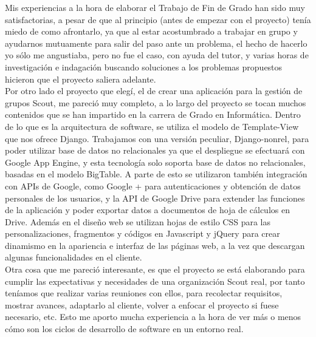 



Mis experiencias a la hora de elaborar el Trabajo de Fin de Grado han sido muy satisfactorias, a pesar de que al principio 
(antes de empezar con el proyecto) tenía miedo de como afrontarlo, ya que al estar acostumbrado a trabajar en grupo y ayudarnos 
mutuamente para salir del paso ante un problema, el hecho de hacerlo yo sólo me angustiaba, pero no fue el caso, con ayuda del 
tutor, y varias horas de investigación e indagación buscando soluciones a los problemas propuestos hicieron que el proyecto saliera adelante.\\

Por otro lado el proyecto que elegí, el de crear una aplicación para la gestión de grupos Scout, me pareció muy completo, a lo 
largo del proyecto se tocan muchos contenidos que se han impartido en la carrera de Grado en Informática. Dentro de lo que es la 
arquitectura de software, se utiliza el modelo de Template-View que nos ofrece Django. Trabajamos con una versión peculiar,
Django-nonrel, para poder utilizar base de datos no relacionales ya que el despliegue se efectuará con Google App Engine, y esta tecnología 
solo soporta base de datos no relacionales, basadas en el modelo BigTable. A parte de esto se utilizaron también integración 
con APIs de Google, como Google + para autenticaciones y obtención de datos personales de los usuarios, y la API de Google Drive para extender 
las funciones de la aplicación y poder exportar datos a documentos de hoja de cálculos en Drive. Además en el diseño web se utilizan 
hojas de estilo CSS para las personalizaciones, fragmentos y códigos en Javascript y jQuery para crear dinamismo en la apariencia e interfaz de las páginas web, 
a la vez que descargan algunas funcionalidades en el cliente.\\

Otra cosa que me pareció interesante, es que el proyecto se está elaborando para cumplir las expectativas y necesidades de una organización 
Scout real, por tanto teníamos que realizar varias reuniones con ellos, para recolectar requisitos, mostrar avances, adaptarlo al cliente, 
volver a enfocar el proyecto si fuese necesario, etc. Esto me aporto mucha experiencia a la hora de ver más o menos cómo son los ciclos de
desarrollo de software en un entorno real.\\


